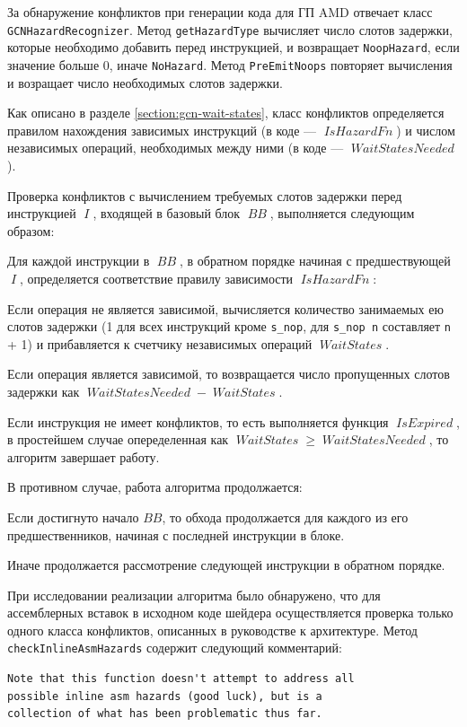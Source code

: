 \documentclass[a4paper,14pt]{extarticle}
\newcommand{\var}[1]{\mathop{\mathit{#1}}}
\begin{document}
{За обнаружение конфликтов при генерации кода для ГП AMD отвечает класс \verb|GCNHazardRecognizer|.
Метод \verb|getHazardType| вычисляет число слотов задержки, которые необходимо добавить
перед инструкцией, и возвращает \verb|NoopHazard|, если значение больше 0, иначе \verb|NoHazard|.
Метод \verb|PreEmitNoops| повторяет вычисления и возращает число необходимых слотов задержки.

Как описано в разделе \ref{section:gcn-wait-states}, класс конфликтов определяется
правилом нахождения зависимых инструкций (в коде — $\var{IsHazardFn}$) и числом
независимых операций, необходимых между ними (в коде — $\var{WaitStatesNeeded}$).

Проверка конфликтов с вычислением требуемых слотов задержки перед инструкцией $\var{I}$,
входящей в базовый блок $\var{BB}$, выполняется следующим образом:
\begin{ol}
\item Для каждой инструкции в $\var{BB}$, в обратном порядке начиная с предшествующей $\var{I}$,
определяется соответствие правилу зависимости $\var{IsHazardFn}$:
  \begin{ul}
  \item Если операция не является зависимой, вычисляется количество занимаемых ею слотов задержки
    (1 для всех инструкций кроме \verb|s_nop|, для \verb|s_nop n| составляет \verb|n| + 1)
    и прибавляется к счетчику независимых операций $\var{WaitStates}$.
  \item Если операция является зависимой, то возвращается число пропущенных слотов задержки
    как $\var{WaitStatesNeeded} - \var{WaitStates}$.
  \end{ul}
\item Если инструкция не имеет конфликтов, то есть выполняется функция $\var{IsExpired}$, в простейшем
  случае опеределенная как $\var{WaitStates} \geqslant \var{WaitStatesNeeded}$, то алгоритм завершает работу.
\item В противном случае, работа алгоритма продолжается:
  \begin{ul}
  \item Если достигнуто начало $BB$, то обхода продолжается для каждого из его предшественников,
    начиная с последней инструкции в блоке.
  \item Иначе продолжается рассмотрение следующей инструкции в обратном порядке.
  \end{ul}
\end{ol}

При исследовании реализации алгоритма было обнаружено, что для ассемблерных вставок в исходном коде шейдера
осуществляется проверка только одного класса конфликтов, описанных в руководстве к архитектуре.
Метод \verb|checkInlineAsmHazards| содержит следующий комментарий:
\begin{verbatim}
Note that this function doesn't attempt to address all
possible inline asm hazards (good luck), but is a
collection of what has been problematic thus far.
\end{verbatim}

}
\end{document}
